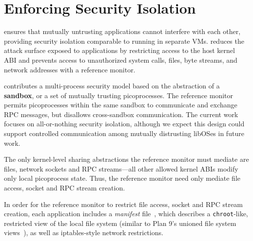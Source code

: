 \section{Enforcing Security Isolation}
\label{sec:graphene:security}

\sysname{} ensures that mutually untrusting applications 
cannot interfere with each other, providing security isolation
comparable to running in separate VMs.
\sysname{} reduces the attack surface exposed to applications
by restricting access to the host kernel ABI 
and prevents access to unauthorized system calls, files, byte streams,
and network addresses with a reference monitor.

\sysname{} contributes a multi-process security model 
based on the abstraction of a {\bf sandbox},
or a set of mutually trusting picoprocesses.
The reference monitor permits picoprocesses within the same sandbox
to communicate and exchange RPC messages, but disallows cross-sandbox communication.
The current work focuses on all-or-nothing security isolation, although we expect
this design could support
controlled communication among mutually distrusting libOSes
in future work.


The only kernel-level sharing abstractions the reference monitor must mediate
are files, network sockets and RPC streams---all other allowed kernel ABIs
modify only local picoprocess state.
Thus, the reference monitor need only mediate file access, socket and RPC stream creation.


In order for the reference monitor to restrict file access, socket and RPC stream creation,
each application includes a {\em manifest} file~\citep{hunt07rethink},
which describes a {\tt chroot}-like, restricted view of the local 
file system (similar to Plan 9's unioned file system views~\citep{pike90plan9}),
as well as iptables-style network restrictions.


